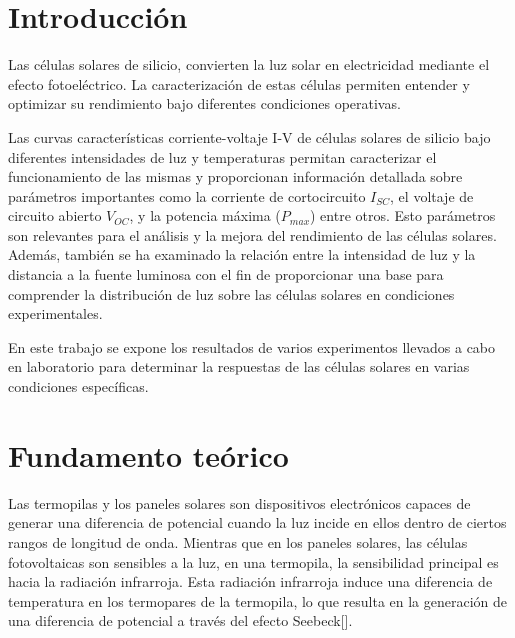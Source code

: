\section{Introducción}

\vspace{\baselineskip}

Las células solares de silicio, convierten la luz solar en electricidad mediante el efecto fotoeléctrico. La caracterización de estas células  permiten entender y optimizar su rendimiento bajo diferentes condiciones operativas.

\vspace{\baselineskip}

Las curvas características corriente-voltaje $\text{I-V}$ de células solares de silicio bajo diferentes intensidades de luz y temperaturas permitan caracterizar el funcionamiento de las mismas y proporcionan información detallada sobre parámetros importantes como la corriente de cortocircuito $I_{SC}$, el voltaje de circuito abierto $V_{OC}$, y la potencia máxima ($P_{max}$) entre otros. Esto parámetros son relevantes para el análisis y la mejora del rendimiento de las células solares. Además, también se ha examinado la relación entre la intensidad de luz y la distancia a la fuente luminosa con el fin  de proporcionar una base para comprender la distribución de luz sobre las células solares en condiciones experimentales.

\vspace{\baselineskip}

En este trabajo se expone los resultados de varios experimentos llevados a cabo en laboratorio para determinar la respuestas de las células solares en varias condiciones específicas. 



\section{Fundamento teórico}

Las termopilas y los paneles solares son dispositivos electrónicos capaces de generar una diferencia de potencial cuando la luz incide en ellos dentro de ciertos rangos de longitud de onda. Mientras que en los paneles solares, las células fotovoltaicas son sensibles a la luz, en una termopila, la sensibilidad principal es hacia la radiación infrarroja. Esta radiación infrarroja induce una diferencia de temperatura en los termopares de la termopila, lo que resulta en la generación de una diferencia de potencial a través del efecto Seebeck​​ [\cite{Goupil}].

